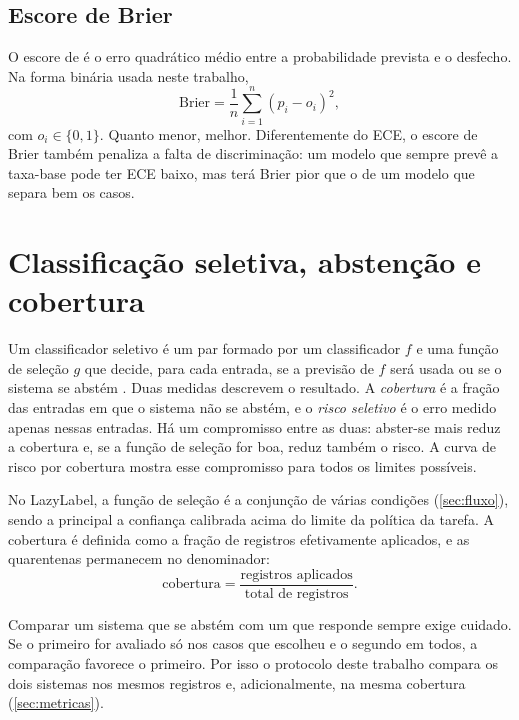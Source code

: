 \subsection{Escore de Brier}

O escore de  é o erro quadrático médio entre a probabilidade prevista e o desfecho. Na forma binária usada neste trabalho,
\begin{equation}
  \mathrm{Brier} = \frac{1}{n}\sum_{i=1}^{n} (\hat{p}_i - o_i)^2,
  \label{eq:brier}
\end{equation}
com $o_i \in \{0,1\}$. Quanto menor, melhor. Diferentemente do ECE, o escore de Brier também penaliza a falta de discriminação: um modelo que sempre prevê a taxa-base pode ter ECE baixo, mas terá Brier pior que o de um modelo que separa bem os casos.

\section{Classificação seletiva, abstenção e cobertura}
\label{sec:seletiva}

Um classificador seletivo é um par formado por um classificador $f$ e uma função de seleção $g$ que decide, para cada entrada, se a previsão de $f$ será usada ou se o sistema se abstém \cite{geifman2017}. Duas medidas descrevem o resultado. A \emph{cobertura} é a fração das entradas em que o sistema não se abstém, e o \emph{risco seletivo} é o erro medido apenas nessas entradas. Há um compromisso entre as duas: abster-se mais reduz a cobertura e, se a função de seleção for boa, reduz também o risco. A curva de risco por cobertura mostra esse compromisso para todos os limites possíveis.

No LazyLabel, a função de seleção é a conjunção de várias condições (\autoref{sec:fluxo}), sendo a principal a confiança calibrada acima do limite da política da tarefa. A cobertura é definida como a fração de registros efetivamente aplicados, e as quarentenas permanecem no denominador:
\begin{equation}
  \text{cobertura} = \frac{\text{registros aplicados}}{\text{total de registros}}.
\end{equation}

Comparar um sistema que se abstém com um que responde sempre exige cuidado. Se o primeiro for avaliado só nos casos que escolheu e o segundo em todos, a comparação favorece o primeiro. Por isso o protocolo deste trabalho compara os dois sistemas nos mesmos registros e, adicionalmente, na mesma cobertura (\autoref{sec:metricas}).

